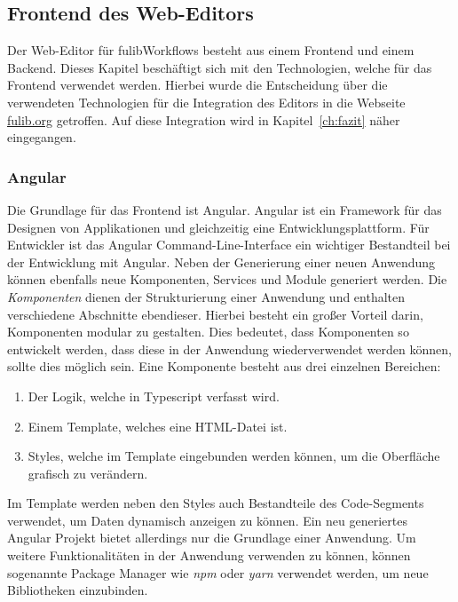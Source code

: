 \subsection{Frontend des Web-Editors}\label{subsec:fulibworkflows-web-editor}
Der Web-Editor für fulibWorkflows besteht aus einem Frontend und einem Backend.
Dieses Kapitel beschäftigt sich mit den Technologien, welche für das Frontend verwendet werden.
Hierbei wurde die Entscheidung über die verwendeten Technologien für die Integration des Editors in die Webseite \url{fulib.org} getroffen.
Auf diese Integration wird in Kapitel~\ref{ch:fazit} näher eingegangen.

\subsubsection{Angular}
Die Grundlage für das Frontend ist Angular.
Angular ist ein Framework für das Designen von Applikationen und gleichzeitig eine Entwicklungsplattform\cite*{angular}.
Für Entwickler ist das Angular Command-Line-Interface ein wichtiger Bestandteil bei der Entwicklung mit Angular.
Neben der Generierung einer neuen Anwendung können ebenfalls neue Komponenten, Services und Module generiert werden.
Die \textit{Komponenten} dienen der Strukturierung einer Anwendung und enthalten verschiedene Abschnitte ebendieser.
Hierbei besteht ein großer Vorteil darin, Komponenten modular zu gestalten.
Dies bedeutet, dass Komponenten so entwickelt werden, dass diese in der Anwendung wiederverwendet werden können, sollte dies möglich sein.
Eine Komponente besteht aus drei einzelnen Bereichen:

\begin{enumerate}
    \item Der Logik, welche in Typescript verfasst wird.
    \item Einem Template, welches eine HTML-Datei ist.
    \item Styles, welche im Template eingebunden werden können, um die Oberfläche grafisch zu verändern.
\end{enumerate}

Im Template werden neben den Styles auch Bestandteile des Code-Segments verwendet, um Daten dynamisch anzeigen zu können.
Ein neu generiertes Angular Projekt bietet allerdings nur die Grundlage einer Anwendung.
Um weitere Funktionalitäten in der Anwendung verwenden zu können, können sogenannte Package Manager wie \textit{npm} oder \textit{yarn}
verwendet werden, um neue Bibliotheken einzubinden.

